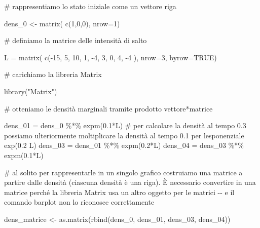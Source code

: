 \documentclass[
  italian,
  letterpaper,
]{book}
\newenvironment{Shaded}{\begin{snugshade}}{\end{snugshade}}
\newcommand{\AttributeTok}[1]{\textcolor[rgb]{0.40,0.45,0.13}{#1}}
\newcommand{\CommentTok}[1]{\textcolor[rgb]{0.37,0.37,0.37}{#1}}
\newcommand{\ConstantTok}[1]{\textcolor[rgb]{0.56,0.35,0.01}{#1}}
\newcommand{\DecValTok}[1]{\textcolor[rgb]{0.68,0.00,0.00}{#1}}
\newcommand{\FloatTok}[1]{\textcolor[rgb]{0.68,0.00,0.00}{#1}}
\newcommand{\FunctionTok}[1]{\textcolor[rgb]{0.28,0.35,0.67}{#1}}
\newcommand{\NormalTok}[1]{\textcolor[rgb]{0.00,0.23,0.31}{#1}}
\newcommand{\OtherTok}[1]{\textcolor[rgb]{0.00,0.23,0.31}{#1}}
\newcommand{\SpecialCharTok}[1]{\textcolor[rgb]{0.37,0.37,0.37}{#1}}
\newcommand{\StringTok}[1]{\textcolor[rgb]{0.13,0.47,0.30}{#1}}
\theoremstyle{definition}
\theoremstyle{remark}
\begin{document}
\begin{Shaded}
\begin{Highlighting}[]
\CommentTok{\# rappresentiamo lo stato iniziale  come un vettore riga}

\NormalTok{dens\_0 }\OtherTok{\textless{}{-}} \FunctionTok{matrix}\NormalTok{( }\FunctionTok{c}\NormalTok{(}\DecValTok{1}\NormalTok{,}\DecValTok{0}\NormalTok{,}\DecValTok{0}\NormalTok{), }\AttributeTok{nrow=}\DecValTok{1}\NormalTok{)}

\CommentTok{\# definiamo la matrice delle intensità di salto}

\NormalTok{L }\OtherTok{=} \FunctionTok{matrix}\NormalTok{( }\FunctionTok{c}\NormalTok{(}\SpecialCharTok{{-}}\DecValTok{15}\NormalTok{, }\DecValTok{5}\NormalTok{, }\DecValTok{10}\NormalTok{, }\DecValTok{1}\NormalTok{, }\SpecialCharTok{{-}}\DecValTok{4}\NormalTok{, }\DecValTok{3}\NormalTok{, }\DecValTok{0}\NormalTok{, }\DecValTok{4}\NormalTok{, }\SpecialCharTok{{-}}\DecValTok{4}\NormalTok{ ), }\AttributeTok{nrow=}\DecValTok{3}\NormalTok{, }\AttributeTok{byrow=}\ConstantTok{TRUE}\NormalTok{)}

\CommentTok{\# carichiamo la libreria Matrix}

\FunctionTok{library}\NormalTok{(}\StringTok{"Matrix"}\NormalTok{)}

\CommentTok{\# otteniamo le densità marginali tramite prodotto vettore*matrice}

\NormalTok{dens\_01 }\OtherTok{=}\NormalTok{ dens\_0 }\SpecialCharTok{\%*\%} \FunctionTok{expm}\NormalTok{(}\FloatTok{0.1}\SpecialCharTok{*}\NormalTok{L)}
\CommentTok{\# per calcolare la densità al tempo 0.3 possiamo ulteriormente moltiplicare la densità al tempo 0.1 per l\textquotesingle{}esponenziale exp(0.2 L)}
\NormalTok{dens\_03 }\OtherTok{=}\NormalTok{ dens\_01 }\SpecialCharTok{\%*\%}  \FunctionTok{expm}\NormalTok{(}\FloatTok{0.2}\SpecialCharTok{*}\NormalTok{L)}
\NormalTok{dens\_04 }\OtherTok{=}\NormalTok{ dens\_03 }\SpecialCharTok{\%*\%}  \FunctionTok{expm}\NormalTok{(}\FloatTok{0.1}\SpecialCharTok{*}\NormalTok{L)}

\CommentTok{\# al solito per rappresentarle in un singolo grafico costruiamo una matrice a partire dalle densità (ciascuna densità è una riga). È necessario convertire in una matrice perché la libreria Matrix usa un altro oggetto per le matrici {-}{-} e il comando barplot non lo riconosce correttamente}

\NormalTok{dens\_matrice }\OtherTok{\textless{}{-}} \FunctionTok{as.matrix}\NormalTok{(}\FunctionTok{rbind}\NormalTok{(dens\_0, dens\_01, dens\_03, dens\_04))}


\end{Highlighting}
\end{Shaded}
\end{document}
